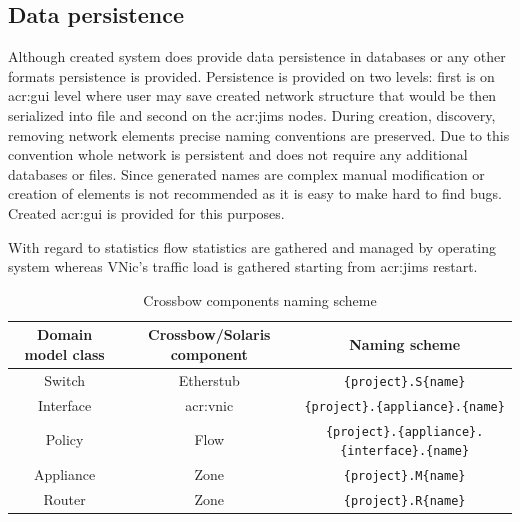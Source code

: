 \documentclass[11pt]{book}
\begin{document}
		
		\subsection{Data persistence}
			\label{sec:impl:persist}

			Although created system does provide data persistence in databases or any other formats persistence is provided. 
			Persistence is provided on two levels: first is on \gls{acr:gui} level where user may save created network structure that would
			be then serialized into file and second on the \gls{acr:jims} nodes. During creation, discovery, removing network elements precise
			naming conventions are preserved. Due to this convention whole network is persistent and does not require any additional 
			databases or files. Since generated names are complex manual modification or creation of elements is not recommended as 
			it is easy to make hard to find bugs. Created \gls{acr:gui} is provided for this purposes.

			With regard to statistics flow statistics are gathered and managed by operating system whereas 
			VNic's traffic load is gathered starting from \gls{acr:jims} restart.

          \begin{table}[H]


            \centering
          
            \begin{tabular}{|c|c|c|}
              \hline
              Domain model class & Crossbow/Solaris component & Naming scheme                                             \\
              \hline \hline
              Switch             & Etherstub                  & \texttt{\{project\}.S\{name\}}                            \\
              \hline
              Interface          & \gls{acr:vnic}             & \texttt{\{project\}.\{appliance\}.\{name\}}               \\
              \hline
              Policy             & Flow                       & \texttt{\{project\}.\{appliance\}.\{interface\}.\{name\}} \\
              \hline
              Appliance          & Zone                       & \texttt{\{project\}.M\{name\}}                            \\
              \hline
              Router             & Zone                       & \texttt{\{project\}.R\{name\}}                            \\
              \hline
            \end{tabular}

            \caption{Crossbow components naming scheme}
            \label{tab:impl:naming}
          
          \end{table}
		
\end{document}

